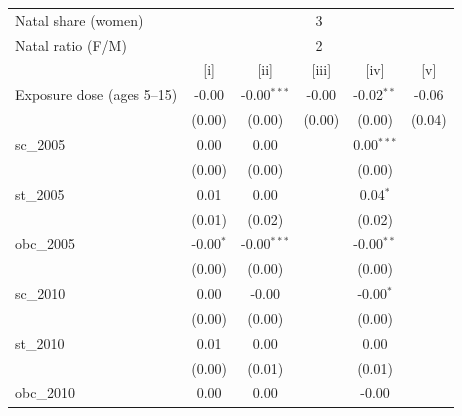 {\centering\scriptsize
\begingroup
\begin{tabular}{@{}lccccc@{}}
   \toprule
   Natal share (women) & \multicolumn{5}{c}{3} \\ 
   Natal ratio (F/M) & \multicolumn{5}{c}{2} \\ 
                                                    & [i]           & [ii]           & [iii]         & [iv]          & [v]\\  
   \midrule 
   Exposure dose (ages 5--15)                       & -0.00        & -0.00$^{***}$ & -0.00        & -0.02$^{**}$  & -0.06\\   
                                                    & (0.00)       & (0.00)        & (0.00)       & (0.00)       & (0.04)\\   
   sc\_2005                                         & 0.00        & 0.00          &               & 0.00$^{***}$ &   \\   
                                                    & (0.00)       & (0.00)        &               & (0.00)       &   \\   
   st\_2005                                         & 0.01          & 0.00          &               & 0.04$^{*}$    &   \\   
                                                    & (0.01)       & (0.02)         &               & (0.02)        &   \\   
   obc\_2005                                        & -0.00$^{*}$  & -0.00$^{***}$ &               & -0.00$^{**}$ &   \\   
                                                    & (0.00)       & (0.00)       &               & (0.00)       &   \\   
   sc\_2010                                         & 0.00        & -0.00        &               & -0.00$^{*}$  &   \\   
                                                    & (0.00)       & (0.00)       &               & (0.00)       &   \\   
   st\_2010                                         & 0.01          & 0.00          &               & 0.00         &   \\   
                                                    & (0.00)       & (0.01)         &               & (0.01)        &   \\   
   obc\_2010                                        & 0.00         & 0.00         &               & -0.00        &   \\   

\end{tabular}}
